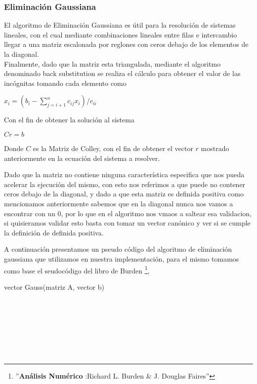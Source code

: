 \subsubsection{Eliminación Gaussiana}

El algoritmo de Eliminación Gaussiana es útil para la resolución de sistemas lineales, con el cual mediante combinaciones lineales entre filas e intercambio  llegar a una matriz escalonada por reglones con ceros debajo de los elementos de la diagonal.\\
Finalmente, dado que la matriz esta triangulada, mediante el algoritmo denominado back substitution se realiza el cálculo para obtener el valor de las incógnitas tomando cada elemento como\\

\begin{center}
$x_i = (b_i - \sum\limits_{j = i + 1}^n c_{ij}x_i) / c_{ii}$ \\
\end{center}

Con el fin de obtener la solución al sistema \\
\begin{center}
$Cr=b$
\end{center}

Donde $C$ es la Matriz de Colley, con el fin de obtener el vector $r$ mostrado anteriormente en la ecuación del sistema a resolver. 

Dado que la matriz no contiene ninguna característica especifica que nos pueda acelerar la ejecución del mismo, con esto nos referimos a que puede no contener ceros debajo de la diagonal, y dado a que esta matriz es definida positiva como mencionamos anteriormente sabemos que en la diagonal nunca nos vamos a encontrar con un 0, por lo que en el algoritmo nos vmaos a saltear esa validacion,
si quisieramos validar esto basta con tomar un vector canónico y ver si se cumple la definición de definida positiva.

A continuación presentamos un pseudo código del algoritmo de eliminación gaussiana que utilizamos en nuestra implementación, para el mismo tomamos como base el seudocódigo del libro de Burden \footnote{''\textbf{Análisis Numérico }:Richard L. Burden & J. Douglas Faires''},

\begin{algorithm}
    \begin{algorithmic}[1]\parskip=2mm  
        \caption{vector Gauss(matriz A, vector b)}
        \\
        \\
        \\
        \\
        \\
        \\
    \end{algorithmic}
\end{algorithm}


